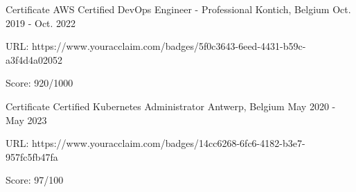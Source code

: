 \begin{cventries}
  \cventry
    {Certificate} %
    {AWS Certified DevOps Engineer - Professional} %
    {Kontich, Belgium} %
    {Oct. 2019 - Oct. 2022} %
    {
      \begin{cvitems} %
        \item {URL: https://www.youracclaim.com/badges/5f0c3643-6eed-4431-b59c-a3f4d4a02052}
        \item {Score: 920/1000}
      \end{cvitems}
    }

  \cventry
    {Certificate} %
    {Certified Kubernetes Administrator} %
    {Antwerp, Belgium} %
    {May 2020 - May 2023} %
    {
      \begin{cvitems} %
        \item {URL: https://www.youracclaim.com/badges/14cc6268-6fc6-4182-b3e7-957fc5fb47fa}
        \item {Score: 97/100}
      \end{cvitems}
    }

\end{cventries}
